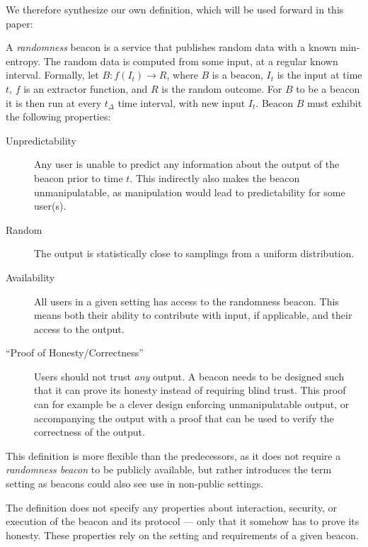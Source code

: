 We therefore synthesize our own definition, which will be used forward in this paper:

A \emph{randomness} beacon is a service  that publishes random data with a known min-entropy. The random data is computed from some input, at a regular known interval.
Formally, let $B: f(I_t) \rightarrow R$, where $B$ is a beacon, $I_t$ is the input at time $t$, $f$ is an extractor function, and $R$ is the random outcome.
For $B$ to be a beacon it is then run at every $t_\Delta$ time interval, with new input $I_t$.
Beacon $B$ must exhibit the following properties:

\begin{description}
    \item[Unpredictability] Any user is unable to predict any information about the output of the beacon prior to time $t$. This indirectly also makes the beacon unmanipulatable, as manipulation would lead to predictability for some user(s).
    \item[Random] The output is statistically close to samplings from a uniform distribution.
    \item[Availability] All users in a given setting has access to the randomness beacon.
    This means both their ability to contribute with input, if applicable, and their access to the output.
    \item[``Proof of Honesty/Correctness''] Users should not trust \emph{any} output. A beacon needs to be designed such that it can prove its honesty instead of requiring blind trust. This proof can for example be a clever design enforcing unmanipulatable output, or accompanying the output with a proof that can be used to verify the correctness of the output.
\end{description}

This definition is more flexible than the predecessors, as it does not require a \emph{randomness beacon} to be publicly available, but rather introduces the term setting as beacons could also see use in non-public settings.

The definition does not specify any properties about interaction, security, or execution of the beacon and its protocol --- only that it somehow has to prove its honesty.
These properties rely on the setting and requirements of a given beacon.

